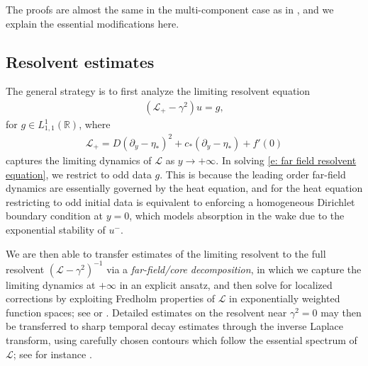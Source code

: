 \documentclass[11pt]{article}
\newcommand{\R}{\mathbb{R}}
\newcommand{\mcl}{\mathcal{L}}
\numberwithin{equation}{section}
\numberwithin{prop}{section}
\begin{document}
The proofs are almost the same in the multi-component case as in \cite{CAMS, SIMA}, and we explain the essential modifications here. 

\subsection{Resolvent estimates}
The general strategy is to first analyze the limiting resolvent equation
\begin{align}
	(\mcl_+ - \gamma^2) u = g, \label{e: far field resolvent equation}
\end{align}
for $g \in L^1_{1,1} (\R)$, where 
\begin{align}
	\mcl_+ = D (\partial_y - \eta_*)^2 + c_* (\partial_y - \eta_*) + f'(0) 
\end{align}
captures the limiting dynamics of $\mcl$ as $y \to +\infty$. In solving \eqref{e: far field resolvent equation}, we restrict to odd data $g$. This is because the leading order far-field dynamics are essentially governed by the heat equation, and for the heat equation restricting to odd initial data is equivalent to enforcing a homogeneous Dirichlet boundary condition at $y = 0$, which models absorption in the wake due to the exponential stability of $u^-$. 

We are then able to transfer estimates of the limiting resolvent to the full resolvent $(\mcl-\gamma^2)^{-1}$ via a \emph{far-field/core decomposition}, in which we capture the limiting dynamics at $+\infty$ in an explicit ansatz, and then solve for localized corrections by exploiting Fredholm properties of $\mcl$ in exponentially weighted function spaces; see \cite[Section 3.2]{CAMS} or \cite[Section 3.1]{SIMA}. Detailed estimates on the resolvent near $\gamma^2 = 0$ may then be transferred to sharp temporal decay estimates through the inverse Laplace transform, using carefully chosen contours which follow the essential spectrum of $\mcl$; see for instance \cite[Section 4]{CAMS}. 
\end{document}
